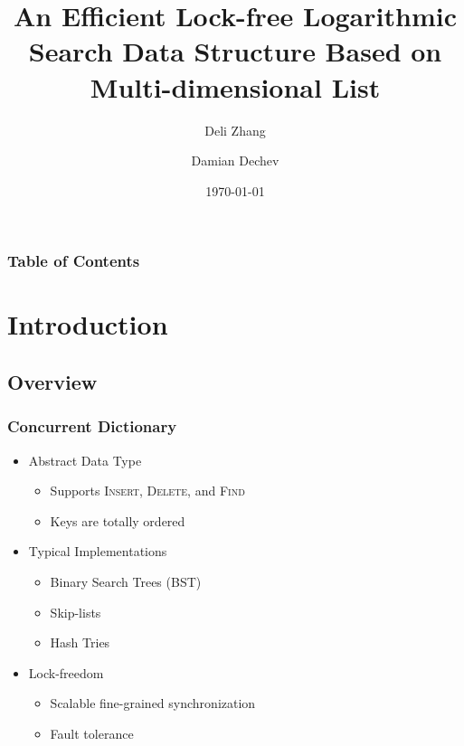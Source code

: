 \documentclass{beamer}
\begin{document}
\title[Logarithmic Search Data Structure Based on MDList]{An Efficient Lock-free Logarithmic Search Data Structure Based on Multi-dimensional List}
\author[D. Zhang \and D. Dechev]{Deli Zhang \and Damian Dechev}

\date{\today}

\begin{frame}
    \titlepage
\end{frame}

\begin{frame}
    \frametitle{Table of Contents}
    \tableofcontents
\end{frame}

\section{Introduction}
\subsection{Overview}
\begin{frame} \frametitle{Concurrent Dictionary}
    \begin{itemize}
        \item Abstract Data Type
            \begin{itemize}
                \item Supports \textsc{Insert}, \textsc{Delete}, and \textsc{Find}
                \item Keys are totally ordered
            \end{itemize}
        \item Typical Implementations
            \begin{itemize}
                \item Binary Search Trees (BST)
                \item Skip-lists
                \item Hash Tries
            \end{itemize}
        \item Lock-freedom
            \begin{itemize}
                \item Scalable fine-grained synchronization
                \item Fault tolerance 
            \end{itemize}
    \end{itemize}
\end{frame}
\end{document}
